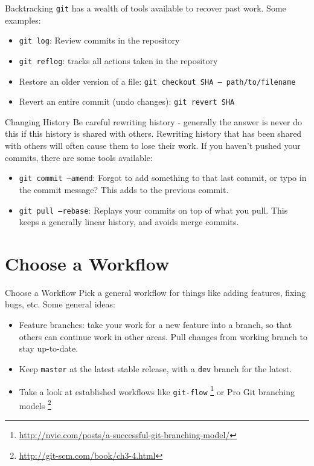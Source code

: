 \documentclass{beamer}
\begin{document}
\begin{frame}{Backtracking}
  \texttt{git} has a wealth of tools available to recover past work. Some
  examples:
  \begin{itemize}
    \item \texttt{git log}: Review commits in the repository
    \item \texttt{git reflog}: tracks all actions taken in the repository
    \item Restore an older version of a file:
          \texttt{git checkout SHA -- path/to/filename}
    \item Revert an entire commit (undo changes):
          \texttt{git revert SHA}
  \end{itemize}
\end{frame}

\begin{frame}{Changing History}
  Be careful rewriting history - generally the answer is never do this if this
  history is shared with others. Rewriting history that has been shared with
  others will often cause them to lose their work. If you haven't pushed your
  commits, there are some tools available:
  \begin{itemize}
    \item \texttt{git commit --amend}: Forgot to add something to that last
          commit, or typo in the commit message? This adds to the previous
          commit.
    \item \texttt{git pull --rebase}: Replays your commits on top of what you
          pull. This keeps a generally linear history, and avoids merge commits.
  \end{itemize}


\end{frame}

\section{Choose a Workflow}
\begin{frame}{Choose a Workflow}
  Pick a general workflow for things like adding features, fixing bugs, etc.
  Some general ideas:
  \begin{itemize}
    \item Feature branches: take your work for a new feature into a branch, so
          that others can continue work in other areas. Pull changes from
          working branch to stay up-to-date.
    \item Keep \texttt{master} at the latest stable release, with a \texttt{dev}
          branch for the latest.
    \item Take a look at established workflows like \texttt{git-flow}
          \footnote{\href{http://nvie.com/posts/a-successful-git-branching-model/}
          {http://nvie.com/posts/a-successful-git-branching-model/}}
          or Pro Git branching models
          \footnote{\href{http://git-scm.com/book/ch3-4.html}
          {http://git-scm.com/book/ch3-4.html}}
  \end{itemize}

\end{frame}
\end{document}
